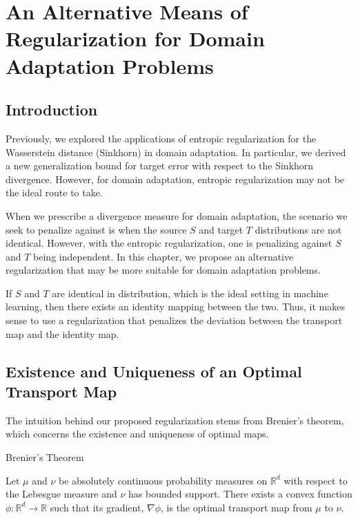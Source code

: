 \chapter{An Alternative Means of Regularization for Domain Adaptation Problems}

\section{Introduction}
Previously, we explored the applications of entropic regularization for the Wasserstein distance (Sinkhorn) in domain adaptation. In particular, we derived a new generalization bound for target error with respect to the Sinkhorn divergence. However, for domain adaptation, entropic regularization may not be the ideal route to take.
 
When we prescribe a divergence measure for domain adaptation, the scenario we seek to penalize against is when the source $S$ and target $T$ distributions are not identical. However, with the entropic regularization, one is penalizing against $S$ and $T$ being independent. In this chapter, we propose an alternative regularization that may be more suitable for domain adaptation problems.

If $S$ and $T$ are identical in distribution, which is the ideal setting in machine learning, then there exists an identity mapping between the two. Thus, it makes sense to use a regularization that penalizes the deviation between the transport map and the identity map.

\newpage

\section{Existence and Uniqueness of an Optimal Transport Map}
The intuition behind our proposed regularization stems from Brenier's theorem, which concerns the existence and uniqueness of optimal maps.

\begin{theorem}{Brenier's Theorem}
	
	Let $\mu$ and $\nu$ be absolutely continuous probability measures on $\mathbb{R}^d$ with respect to the Lebesgue measure and $\nu$ has bounded support. There exists a convex function $\phi: \mathbb{R}^d\to \mathbb{R}$ such that its gradient, $\nabla \phi$, is the optimal transport map from $\mu$ to $\nu$.  
	
\end{theorem}

